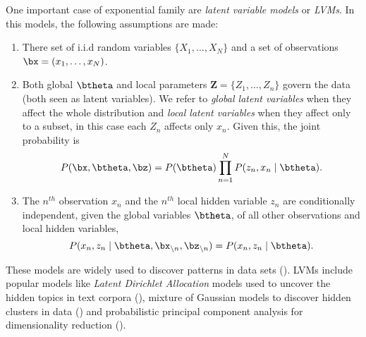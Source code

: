 One important case of exponential family are \emph{latent variable models} or \emph{LVMs}. In this models, the following assumptions are made:
\begin{enumerate}\itemsep0.5em
  \item There set of i.i.d random variables \(\{X_{1},\dots,X_{N}\}\) and a set of observations \(\bx = (x_{1}, \dots, x_{N})\).
  \item Both global \(\btheta\) and local parameters \(\bm{Z} = \{Z_{1}, \dots, Z_{n}\}\) govern the data (both seen as latent variables). We refer to \emph{global latent variables} when they affect the whole distribution and \emph{local latent variables} when they affect only to a subset, in this case each \(Z_{n}\) affects only \(x_{n}\). Given this, the joint probability is
    \[
    P(\bx, \btheta, \bz) = P(\btheta)\prod_{n=1}^{N}P(z_{n}, x_{n} \mid \btheta).
    \]
  \item The \(n^{th}\) observation \(x_{n}\) and the \(n^{th}\) local hidden variable \(z_{n}\) are conditionally independent, given the global variables \(\btheta\), of all other observations and local hidden variables,
    \[
    P(x_{n},z_{n} \mid \btheta, \bx_{\backslash n}, \bz_{\backslash n}) = P(x_{n}, z_{n} \mid \btheta).
    \]
\end{enumerate}

\begin{remark}
  These models are widely used to discover patterns in data sets (\cite{blei2014build}).
  LVMs include popular models like \emph{Latent Dirichlet Allocation} models used to uncover the hidden topics in text corpora (\cite{blei2003latent}), mixture of Gaussian models to discover hidden clusters in data (\cite{bishop2006pattern}) and probabilistic principal component analysis for dimensionality reduction (\cite{tipping1999probabilistic}).
\end{remark}

